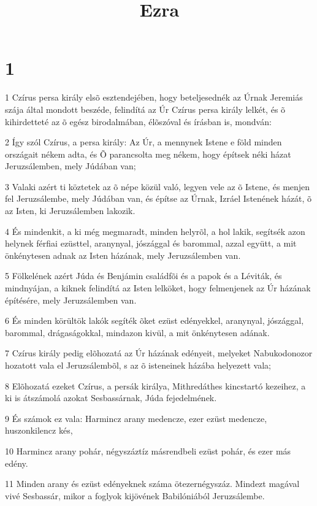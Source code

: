 

\title{Ezra}


\chapter{1}

\par 1 Czírus persa király elsõ esztendejében, hogy beteljesednék az Úrnak Jeremiás szája által mondott beszéde, felindítá az Úr Czírus persa király lelkét, és õ kihirdetteté az õ egész birodalmában, élõszóval és írásban is, mondván:
\par 2 Így szól Czírus, a persa király: Az Úr, a mennynek Istene e föld minden országait nékem adta, és Õ parancsolta meg nékem, hogy építsek néki házat Jeruzsálemben, mely Júdában van;
\par 3 Valaki azért ti köztetek az õ népe közül való, legyen vele az õ Istene, és menjen fel Jeruzsálembe, mely Júdában van, és építse az Úrnak, Izráel Istenének házát, õ az Isten, ki Jeruzsálemben lakozik.
\par 4 És mindenkit, a ki még megmaradt, minden helyrõl, a hol lakik, segítsék azon helynek férfiai ezüsttel, aranynyal, jószággal és barommal, azzal együtt, a mit önkénytesen adnak az Isten házának, mely Jeruzsálemben van.
\par 5 Fölkelének azért Júda és Benjámin családfõi és a papok és a Léviták, és mindnyájan, a kiknek felindítá az Isten lelköket, hogy felmenjenek az Úr házának építésére, mely Jeruzsálemben van.
\par 6 És minden körültök lakók segíték õket ezüst edényekkel, aranynyal, jószággal, barommal, drágaságokkal, mindazon kivül, a mit önkénytesen adának.
\par 7 Czírus király pedig elõhozatá az Úr házának edényeit, melyeket Nabukodonozor hozatott vala el Jeruzsálembõl, s az õ isteneinek házába helyezett vala;
\par 8 Elõhozatá ezeket Czírus, a persák királya, Mithredáthes kincstartó kezeihez, a ki is átszámolá azokat Sesbassárnak, Júda fejedelmének.
\par 9 És számok ez vala: Harmincz arany medencze, ezer ezüst medencze, huszonkilencz kés,
\par 10 Harmincz arany pohár, négyszáztíz másrendbeli ezüst pohár, és ezer más edény.
\par 11 Minden arany és ezüst edényeknek száma ötezernégyszáz. Mindezt magával vivé Sesbassár, mikor a foglyok kijövének Babilóniából Jeruzsálembe.

